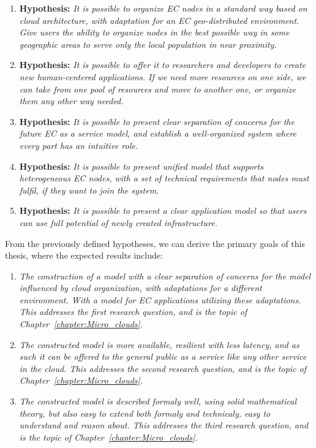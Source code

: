 \begin{enumerate}[start=1,label={(\bfseries \arabic*)}]
	\item \textbf{Hypothesis:} \textit{It is possible to organize EC nodes in a standard way based on cloud architecture, with adaptation for an EC geo-distributed environment. Give users the ability to organize nodes in the best possible way in some geographic areas to serve only the local population in near proximity.}
	\item \textbf{Hypothesis:} \textit{It is possible to offer it to researchers and developers to create new human-centered applications. If we need more resources on one side, we can take from one pool of resources and move to another one, or organize them any other way needed.}
	\item \textbf{Hypothesis:} \textit{It is possible to present clear separation of concerns for the future EC as a service model, and establish a well-organized system where every part has an intuitive role.} 
	\item \textbf{Hypothesis:} \textit{It is possible to present unified model that supports heterogeneous EC nodes, with a set of technical requirements that nodes must fulfil, if they want to join the system.}
	\item \textbf{Hypothesis:} \textit{It is possible to present a clear application model so that users can use full potential of newly created infrastructure.}
\end{enumerate}

From the previously defined hypotheses, we can derive the primary goals of this thesis, where the expected results include:

\begin{enumerate}[start=1,label={(\bfseries \arabic*)}]
	\item \textit{The construction of a model with a clear separation of concerns for the model influenced by cloud organization, with adaptations for a different environment. With a model for EC applications utilizing these adaptations. This addresses the first research question, and is the topic of Chapter~\ref{chapter:Micro_clouds}.}
	\item \textit{The constructed model is more available, resilient with less latency, and as such it can be offered to the general public as a service like any other service in the cloud. This addresses the second research question, and is the topic of Chapter~\ref{chapter:Micro_clouds}.}
	\item \textit{The constructed model is described formaly well, using solid mathematical theory, but also easy to extend both formaly and technicaly, easy to understand and reason about. This addresses the third research question, and is the topic of Chapter~\ref{chapter:Micro_clouds}.}
\end{enumerate}
%
%
